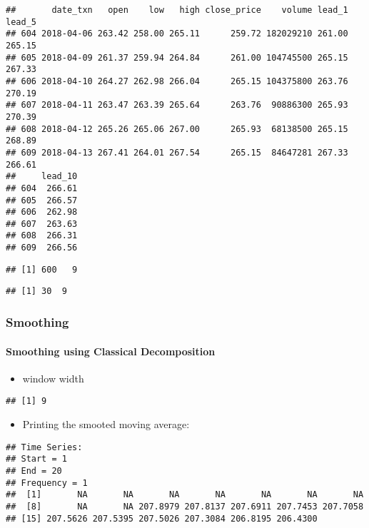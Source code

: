 \documentclass[]{article}
\providecommand{\tightlist}{%
  \setlength{\itemsep}{0pt}\setlength{\parskip}{0pt}}
\let\oldparagraph\paragraph
\renewcommand{\paragraph}[1]{\oldparagraph{#1}\mbox{}}
\begin{document}
\begin{verbatim}
##       date_txn   open    low   high close_price    volume lead_1 lead_5
## 604 2018-04-06 263.42 258.00 265.11      259.72 182029210 261.00 265.15
## 605 2018-04-09 261.37 259.94 264.84      261.00 104745500 265.15 267.33
## 606 2018-04-10 264.27 262.98 266.04      265.15 104375800 263.76 270.19
## 607 2018-04-11 263.47 263.39 265.64      263.76  90886300 265.93 270.39
## 608 2018-04-12 265.26 265.06 267.00      265.93  68138500 265.15 268.89
## 609 2018-04-13 267.41 264.01 267.54      265.15  84647281 267.33 266.61
##     lead_10
## 604  266.61
## 605  266.57
## 606  262.98
## 607  263.63
## 608  266.31
## 609  266.56
\end{verbatim}

\begin{verbatim}
## [1] 600   9
\end{verbatim}

\begin{verbatim}
## [1] 30  9
\end{verbatim}

\subsubsection{Smoothing}\label{smoothing}

\paragraph{Smoothing using Classical
Decomposition}\label{smoothing-using-classical-decomposition}

\begin{itemize}
\tightlist
\item
  window width
\end{itemize}

\begin{verbatim}
## [1] 9
\end{verbatim}

\begin{itemize}
\tightlist
\item
  Printing the smooted moving average:
\end{itemize}

\begin{verbatim}
## Time Series:
## Start = 1 
## End = 20 
## Frequency = 1 
##  [1]       NA       NA       NA       NA       NA       NA       NA
##  [8]       NA       NA 207.8979 207.8137 207.6911 207.7453 207.7058
## [15] 207.5626 207.5395 207.5026 207.3084 206.8195 206.4300
\end{verbatim}
\end{document}
